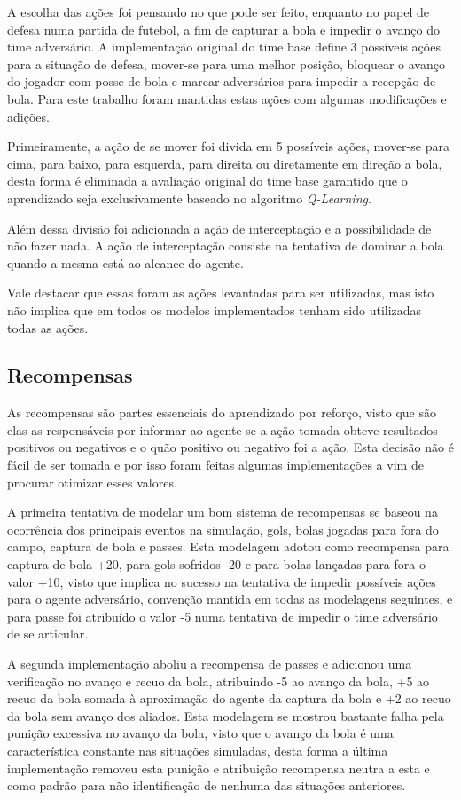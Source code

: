 A escolha das ações foi pensando no que pode ser feito, enquanto no papel de
defesa numa partida de futebol, a fim de capturar a bola e impedir o avanço do
time adversário. A implementação original do time base define 3 possíveis ações
para a situação de defesa, mover-se para uma melhor posição, bloquear o avanço
do jogador com posse de bola e marcar adversários para impedir a recepção de
bola. Para este trabalho foram mantidas estas ações com algumas modificações e
adições.

Primeiramente, a ação de se mover foi divida em 5 possíveis ações, mover-se para
cima, para baixo, para esquerda, para direita ou diretamente em direção a bola, desta forma é eliminada a
avaliação original do time base garantido que o aprendizado seja exclusivamente
baseado no algoritmo \textit{Q-Learning}.

Além dessa divisão foi adicionada a ação de interceptação e a possibilidade de
não fazer nada. A ação de interceptação consiste na tentativa de dominar a bola
quando a mesma está ao alcance do agente.

Vale destacar que essas foram as ações levantadas para ser utilizadas, mas isto
não implica que em todos os modelos implementados tenham sido utilizadas todas
as ações.

\subsection{Recompensas}\label{rewards}

As recompensas são partes essenciais do aprendizado por reforço, visto que são
elas as responsáveis por informar ao agente se a ação tomada obteve resultados
positivos ou negativos e o quão positivo ou negativo foi a ação. Esta decisão
não é fácil de ser tomada e por isso foram feitas algumas implementações a vim
de procurar otimizar esses valores.

A primeira tentativa de modelar um bom sistema de recompensas se baseou na
ocorrência dos principais eventos na simulação, gols, bolas jogadas para fora do
campo, captura de bola e passes. Esta modelagem adotou como recompensa para
captura de bola +20, para gols sofridos -20 e para bolas lançadas para fora o
valor +10, visto que implica no sucesso na tentativa de impedir possíveis ações para o
agente adversário, convenção mantida em todas as
modelagens seguintes, e para passe foi atribuído o valor -5 numa tentativa de
impedir o time adversário de se articular.

A segunda implementação aboliu a recompensa de passes e adicionou uma
verificação no avanço e recuo da bola, atribuindo -5 ao avanço da bola, +5 ao
recuo da bola somada à aproximação do agente da captura da bola e +2 ao recuo da
bola sem avanço dos aliados. Esta modelagem se mostrou bastante falha pela
punição excessiva no avanço da bola, visto que o avanço da bola é uma
característica constante nas situações simuladas, desta forma a última
implementação removeu esta punição e atribuição recompensa neutra a esta e como
padrão para não identificação de nenhuma das situações anteriores.

